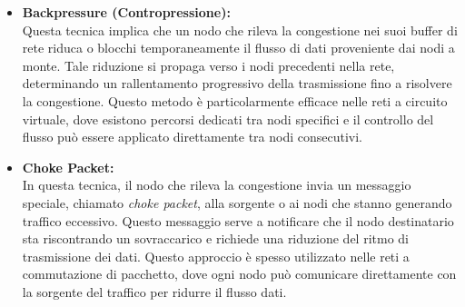 \documentclass[12pt]{report}
\begin{document}
\begin{itemize}
    \item \textbf{Backpressure (Contropressione):} \\
    Questa tecnica implica che un nodo che rileva la congestione nei suoi buffer di rete riduca o blocchi temporaneamente il flusso di dati proveniente dai nodi a monte. Tale riduzione si propaga verso i nodi precedenti nella rete, determinando un rallentamento progressivo della trasmissione fino a risolvere la congestione. Questo metodo è particolarmente efficace nelle reti a circuito virtuale, dove esistono percorsi dedicati tra nodi specifici e il controllo del flusso pu\`o essere applicato direttamente tra nodi consecutivi.

    \item \textbf{Choke Packet:} \\
    In questa tecnica, il nodo che rileva la congestione invia un messaggio speciale, chiamato \textit{choke packet}, alla sorgente o ai nodi che stanno generando traffico eccessivo. Questo messaggio serve a notificare che il nodo destinatario sta riscontrando un sovraccarico e richiede una riduzione del ritmo di trasmissione dei dati. Questo approccio è spesso utilizzato nelle reti a commutazione di pacchetto, dove ogni nodo pu\`o comunicare direttamente con la sorgente del traffico per ridurre il flusso dati.
\end{itemize}
\end{document}
